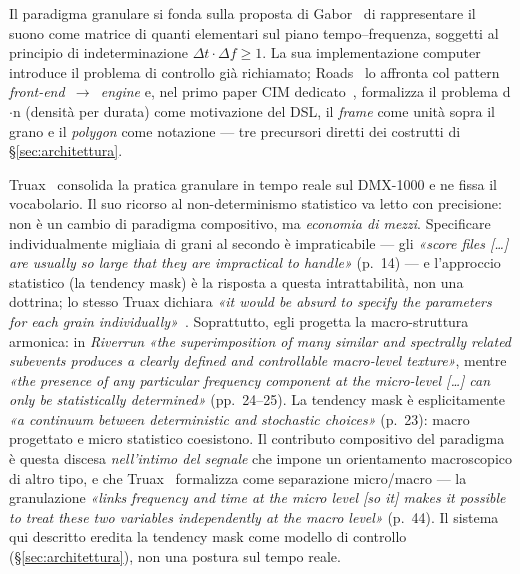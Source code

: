 \documentclass[10pt,twocolumn,a4paper]{article}
\begin{document}
Il paradigma granulare si fonda sulla proposta di Gabor~\cite{Gabor1947}
di rappresentare il suono come matrice di quanti elementari sul piano
tempo--frequenza, soggetti al principio di indeterminazione
$\Delta t \cdot \Delta f \geq 1$. La sua implementazione computer
introduce il problema di controllo già richiamato; Roads~\cite{Roads1978}
lo affronta col pattern \emph{front-end~$\to$~engine} e, nel primo
paper CIM dedicato~\cite{Roads1985cim}, formalizza il problema d$\cdot$n
(densità per durata) come motivazione del DSL, il \emph{frame} come
unità sopra il grano e il \emph{polygon} come notazione --- tre
precursori diretti dei costrutti di \S\ref{sec:architettura}.

Truax~\cite{Truax1988} consolida la pratica granulare in tempo reale sul
DMX-1000 e ne fissa il vocabolario. Il suo ricorso al non-determinismo
statistico va letto con precisione: non è un cambio di paradigma
compositivo, ma \emph{economia di mezzi}. Specificare individualmente
migliaia di grani al secondo è impraticabile --- gli \emph{«score files
[\dots] are usually so large that they are impractical to handle»}
(p.~14) --- e l'approccio statistico (la tendency mask) è la risposta a
questa intrattabilità, non una dottrina; lo stesso Truax dichiara
\emph{«it would be absurd to specify the parameters for each grain
individually»}~\cite{Truax1990}. Soprattutto, egli progetta la
macro-struttura armonica: in \emph{Riverrun} \emph{«the superimposition
of many similar and spectrally related subevents produces a clearly
defined and controllable macro-level texture»}, mentre \emph{«the
presence of any particular frequency component at the micro-level
[\dots] can only be statistically determined»} (pp.~24--25). La tendency
mask è esplicitamente \emph{«a continuum between deterministic and
stochastic choices»} (p.~23): macro progettato e micro statistico
coesistono. Il contributo compositivo del paradigma è questa discesa
\emph{nell'intimo del segnale} che impone un orientamento macroscopico
di altro tipo, e che Truax~\cite{Truax1994} formalizza come separazione
micro/macro --- la granulazione \emph{«links frequency and time at the
micro level [so it] makes it possible to treat these two variables
independently at the macro level»} (p.~44). Il sistema qui descritto
eredita la tendency mask come modello di controllo
(\S\ref{sec:architettura}), non una postura sul tempo reale.
\end{document}
